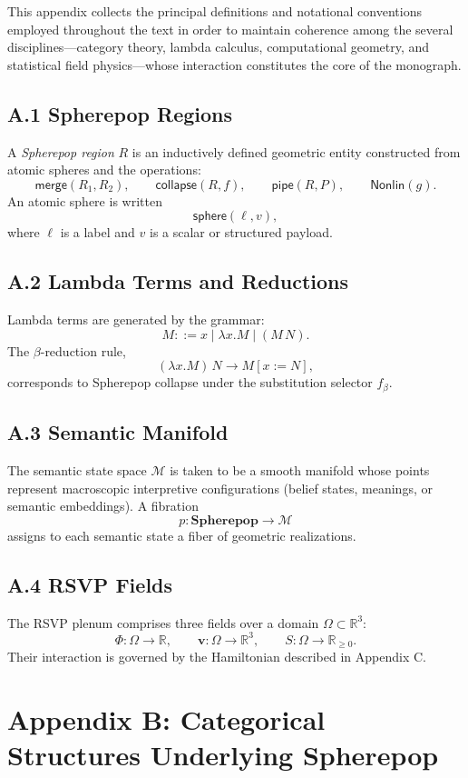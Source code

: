 \documentclass[12pt,letterpaper]{article}
\begin{document}
This appendix collects the principal definitions and notational conventions
employed throughout the text in order to maintain coherence among the several
disciplines---category theory, lambda calculus, computational geometry, and
statistical field physics---whose interaction constitutes the core of the
monograph.

\subsection*{A.1 Spherepop Regions}
A \emph{Spherepop region} $R$ is an inductively defined geometric entity constructed
from atomic spheres and the operations:
\[
\mathsf{merge}(R_1,R_2), 
\qquad
\mathsf{collapse}(R,f),
\qquad
\mathsf{pipe}(R,P),
\qquad
\mathsf{Nonlin}(g).
\]
An atomic sphere is written
\[
\mathsf{sphere}(\ell, v),
\]
where $\ell$ is a label and $v$ is a scalar or structured payload.

\subsection*{A.2 Lambda Terms and Reductions}
Lambda terms are generated by the grammar:
\[
M ::= x \mid \lambda x.M \mid (M\,N).
\]
The $\beta$-reduction rule,
\[
(\lambda x.M)\,N \to M[x:=N],
\]
corresponds to Spherepop collapse under the substitution selector $f_{\beta}$.

\subsection*{A.3 Semantic Manifold}
The semantic state space $\mathcal{M}$ is taken to be a smooth manifold whose points
represent macroscopic interpretive configurations (belief states, meanings, or
semantic embeddings).  A fibration
\[
p : \mathbf{Spherepop} \to \mathcal{M}
\]
assigns to each semantic state a fiber of geometric realizations.

\subsection*{A.4 RSVP Fields}
The RSVP plenum comprises three fields over a domain $\Omega \subset \mathbb{R}^3$:
\[
\Phi : \Omega \to \mathbb{R}, \qquad 
\mathbf{v} : \Omega \to \mathbb{R}^3, \qquad
S : \Omega \to \mathbb{R}_{\ge 0}.
\]
Their interaction is governed by the Hamiltonian described in Appendix C.


\section{Appendix B: Categorical Structures Underlying Spherepop}
\end{document}
